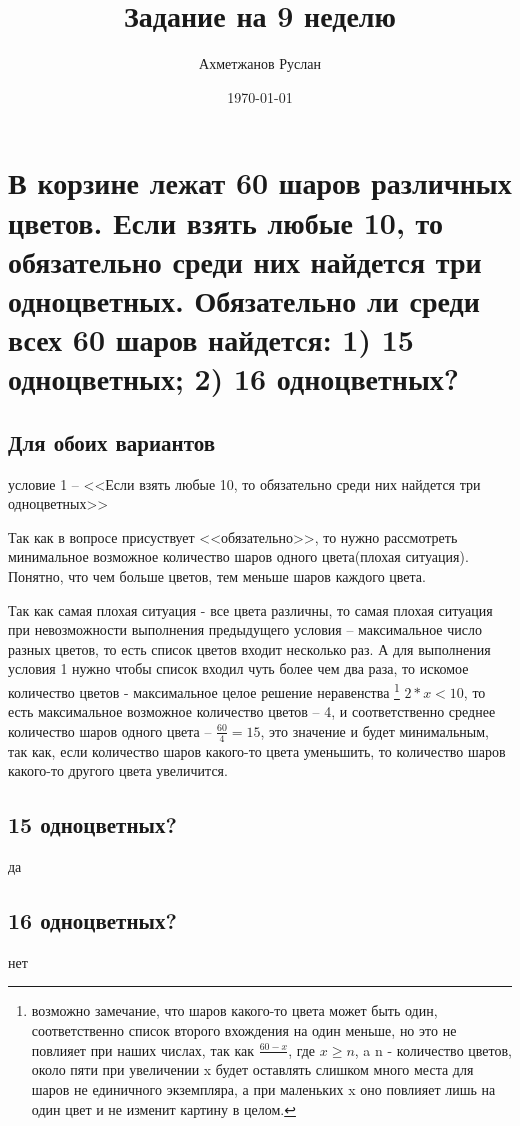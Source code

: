 \documentclass[a4paper,11pt]{article}
\author{Ахметжанов Руслан}
\title{Задание на 9 неделю}
\date{\today}
\begin{document}
\maketitle 

\section{В корзине лежат 60 шаров различных цветов. Если взять любые 10, то обязательно среди них найдется три одноцветных. Обязательно ли среди всех 60 шаров найдется: 1) 15 одноцветных; 2) 16 одноцветных?}
\subsection{Для обоих вариантов}
условие 1 -- <<Если взять любые 10, то обязательно среди них найдется три одноцветных>>


Так как в вопросе присуствует <<обязательно>>, то нужно рассмотреть минимальное возможное количество шаров одного цвета(плохая ситуация). Понятно, что чем больше цветов, тем меньше шаров каждого цвета. 


Так как самая плохая ситуация - все цвета различны, то самая плохая ситуация при невозможности выполнения предыдущего условия -- максимальное число разных цветов, то есть список цветов входит несколько раз. А для выполнения условия 1 нужно чтобы список входил чуть более чем два раза,  то искомое количество цветов - максимальное целое решение неравенства
\footnote{возможно замечание, что шаров какого-то цвета может быть один, соответственно список второго вхождения на один меньше, но это не повлияет при наших числах, так как $ \frac{60-x}{} $, где $x \geq n$, a n - количество цветов, около пяти при увеличении x будет оставлять слишком много места для шаров не единичного экземпляра, а при маленьких x оно повлияет лишь на один цвет и не изменит картину в целом.}
 $ 2*x < 10 $, то есть максимальное возможное количество цветов -- 4, и соответственно среднее количество шаров одного цвета -- $\frac{60}{4} = 15$,  это значение и будет минимальным, так как, если количество шаров какого-то цвета уменьшить, то количество шаров какого-то другого цвета увеличится.


\subsection{15 одноцветных?}
да

\subsection{16 одноцветных?}
нет
\end{document}
